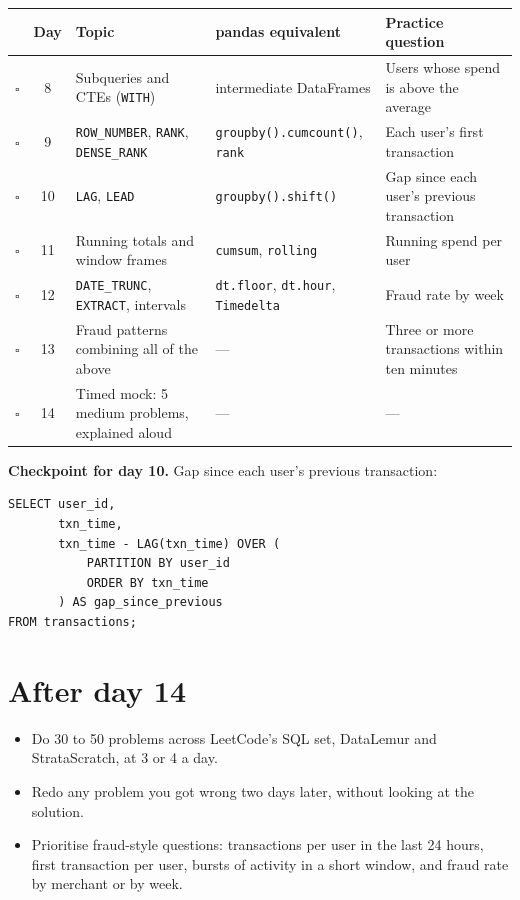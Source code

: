 \documentclass[11pt,a4paper]{article}
\newcommand{\code}[1]{\texttt{#1}}
\newcommand{\done}{$\square$}
\begin{document}
{\small
\begin{tabularx}{\textwidth}{@{}c c L L L@{}}
\toprule
 & \textbf{Day} & \textbf{Topic} & \textbf{pandas equivalent} & \textbf{Practice question} \\
\midrule
\done & 8  & Subqueries and CTEs (\code{WITH})
      & intermediate DataFrames
      & Users whose spend is above the average \\
\done & 9  & \code{ROW\_NUMBER}, \code{RANK}, \code{DENSE\_RANK}
      & \code{groupby().cumcount()}, \code{rank}
      & Each user's first transaction \\
\done & 10 & \code{LAG}, \code{LEAD}
      & \code{groupby().shift()}
      & Gap since each user's previous transaction \\
\done & 11 & Running totals and window frames
      & \code{cumsum}, \code{rolling}
      & Running spend per user \\
\done & 12 & \code{DATE\_TRUNC}, \code{EXTRACT}, intervals
      & \code{dt.floor}, \code{dt.hour}, \code{Timedelta}
      & Fraud rate by week \\
\done & 13 & Fraud patterns combining all of the above
      & ---
      & Three or more transactions within ten minutes \\
\done & 14 & Timed mock: 5 medium problems, explained aloud
      & ---
      & --- \\
\bottomrule
\end{tabularx}\par
}

\textbf{Checkpoint for day 10.} Gap since each user's previous transaction:

\begin{lstlisting}
SELECT user_id,
       txn_time,
       txn_time - LAG(txn_time) OVER (
           PARTITION BY user_id
           ORDER BY txn_time
       ) AS gap_since_previous
FROM transactions;
\end{lstlisting}

\section{After day 14}

\begin{itemize}
  \item Do 30 to 50 problems across LeetCode's SQL set, DataLemur and StrataScratch,
        at 3 or 4 a day.
  \item Redo any problem you got wrong two days later, without looking at the solution.
  \item Prioritise fraud-style questions: transactions per user in the last 24 hours,
        first transaction per user, bursts of activity in a short window, and fraud rate
        by merchant or by week.
\end{itemize}
\end{document}
